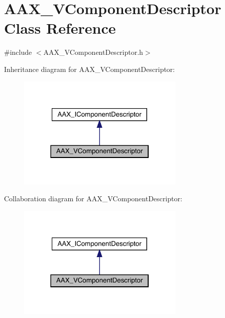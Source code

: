 \hypertarget{a01901}{}\section{A\+A\+X\+\_\+\+V\+Component\+Descriptor Class Reference}
\label{a01901}


{\ttfamily \#include $<$A\+A\+X\+\_\+\+V\+Component\+Descriptor.\+h$>$}



Inheritance diagram for A\+A\+X\+\_\+\+V\+Component\+Descriptor\+:
\nopagebreak
\begin{figure}[H]
\begin{center}
\leavevmode
\includegraphics[width=226pt]{a01900}
\end{center}
\end{figure}


Collaboration diagram for A\+A\+X\+\_\+\+V\+Component\+Descriptor\+:
\nopagebreak
\begin{figure}[H]
\begin{center}
\leavevmode
\includegraphics[width=226pt]{a01899}
\end{center}
\end{figure}


